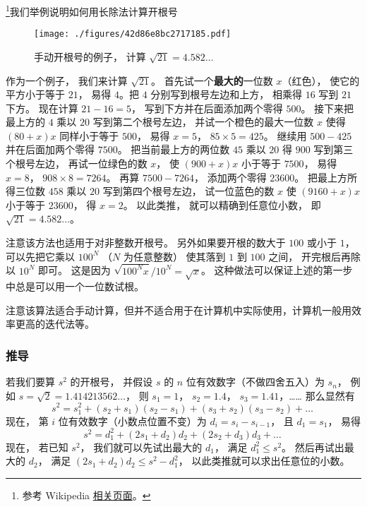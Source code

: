 
\footnote{参考 Wikipedia \href{https://en.wikipedia.org/wiki/Methods_of_computing_square_roots}{相关页面}。}我们举例说明如何用长除法计算开根号
\begin{example}{}
\begin{figure}[ht]
\centering
\texttt{[image: ./figures/42d86e8bc2717185.pdf]}
\caption{手动开根号的例子， 计算 $\sqrt{21} = 4.582\dots$} \label{fig_Hsqrt_1}
\end{figure}
作为一个例子， 我们来计算 $\sqrt{21}$。 首先试一个\textbf{最大的}一位数 $x$（红色）， 使它的平方小于等于 $21$， 易得 $4$。把 $4$ 分别写到根号左边和上方， 相乘得 $16$ 写到 $21$ 下方。 现在计算 $21-16 = 5$， 写到下方并在后面添加两个零得 $500$。 接下来把最上方的 $4$ 乘以 $20$ 写到第二个根号左边， 并试一个橙色的最大一位数 $x$ 使得 $(80+x) x$ 同样小于等于 $500$， 易得 $x = 5$， $85\times 5 = 425$。 继续用 $500-425$ 并在后面加两个零得 $7500$。 把当前最上方的两位数 $45$ 乘以 $20$ 得 $900$ 写到第三个根号左边， 再试一位绿色的数 $x$， 使 $(900+ x) x$ 小于等于 $7500$， 易得 $x = 8$， $908\times 8 = 7264$。 再算 $7500-7264$， 添加两个零得 $23600$。 把最上方所得三位数 $458$ 乘以 $20$ 写到第四个根号左边， 试一位蓝色的数 $x$ 使 $(9160+x)x$ 小于等于 $23600$， 得 $x = 2$。 以此类推， 就可以精确到任意位小数， 即 $\sqrt{21} = 4.582\dots$。

注意该方法也适用于对非整数开根号。 另外如果要开根的数大于 $100$ 或小于 $1$， 可以先把它乘以 $100^{N}$ （$N$ 为任意整数） 使其落到 $1$ 到 $100$ 之间， 开完根后再除以 $10^N$ 即可。 这是因为 $\sqrt{100^{N} x}/10^N =  \sqrt{x}$。 这种做法可以保证上述的第一步中总是可以用一个一位数试根。
\end{example}

注意该算法适合手动计算，但并不适合用于在计算机中实际使用，计算机一般用效率更高的迭代法等。

\subsubsection{推导}
若我们要算 $s^2$ 的开根号， 并假设 $s$ 的 $n$ 位有效数字（不做四舍五入）为 $s_n$， 例如 $s = \sqrt{2} = 1.414213562\dots$， 则 $s_1 = 1$， $s_2=1.4$， $s_3=1.41$，…… 那么显然有
\begin{equation}
s^2 = s_1^2 + (s_2+s_1)(s_2-s_1) + (s_3+s_2)(s_3-s_2) + \dots~
\end{equation}
现在， 第 $i$ 位有效数字（小数点位置不变）为 $d_i = s_i-s_{i-1}$， 且 $d_1 = s_1$， 易得
\begin{equation}
s^2 = d_1^2 + (2s_1 + d_2)d_2 + (2s_2 + d_3)d_3 + \dots~
\end{equation}
现在， 若已知 $s^2$， 我们就可以先试出最大的 $d_1$， 满足 $d_1^2\leqslant s^2$。 然后再试出最大的 $d_2$， 满足 $(2s_1 + d_2)d_2 \leqslant s^2 - d_1^2$， 以此类推就可以求出任意位的小数。

